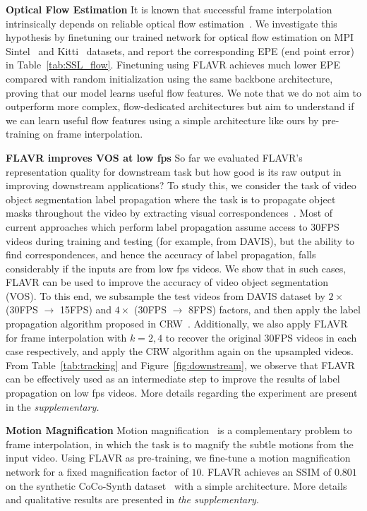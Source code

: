 \documentclass[10pt,twocolumn,letterpaper]{article}
\newcommand{\figref}[1]{Figure~\ref{#1}}
\newcommand{\tabref}[1]{Table~\ref{#1}}
\newcommand{\red}[1]{{#1}}
\newcommand{\Ours}{FLAVR}
\newcommand{\twox}{$2\times$}
\newcommand{\fourx}{$4\times$}
\begin{document}
{\bf Optical Flow Estimation} It is known that successful frame interpolation intrinsically depends on reliable optical flow estimation~\cite{wulff2018temporal}. We investigate this hypothesis by finetuning our trained network for optical flow estimation on MPI Sintel~\cite{Butler_ECCV_2012} and Kitti~\cite{Geiger2012CVPR, Menze2015CVPR} datasets, and report the corresponding EPE (end point error) in \tabref{tab:SSL_flow}. Finetuning using \Ours{} achieves much lower EPE compared with random initialization using the same backbone architecture, proving that our model learns useful flow features. We note that we do not aim to outperform more complex, flow-dedicated architectures\cite{ilg2017flownet, liu2019selflow} but aim to understand if we can learn useful flow features using a simple architecture like ours by pre-training on frame interpolation.

{\bf \Ours{} improves VOS at low fps} \red{ So far we evaluated \Ours{}'s representation quality for downstream task but how good is its raw output in improving downstream applications? To study this, we consider the task of video object segmentation label propagation where the task is to propagate object masks throughout the video by extracting visual correspondences~\cite{jabri2020space, wang2019learning, xu2021rethinking, li2019joint}. Most of current approaches which perform label propagation assume access to 30FPS videos during training and testing (for example, from DAVIS), but the ability to find correspondences, and hence the accuracy of label propagation, falls considerably if the inputs are from low fps videos. We show that in such cases, \Ours{} can be used to improve the accuracy of video object segmentation (VOS). To this end, we subsample the test videos from DAVIS dataset by \twox{} (30FPS $\rightarrow$ 15FPS) and \fourx{} (30FPS $\rightarrow$ 8FPS) factors, and then apply the label propagation algorithm proposed in CRW~\cite{jabri2020space}. Additionally, we also apply \Ours{} for frame interpolation with $k=2,4$ to recover the original 30FPS videos in each case respectively, and apply the CRW algorithm again on the upsampled videos. From \tabref{tab:tracking} and \figref{fig:downstream}, we observe that \Ours{} can be effectively used as an intermediate step to improve the results of label propagation on low fps videos. More details regarding the experiment are present in the \em{supplementary}.}

{\bf Motion Magnification} Motion magnification~\cite{wu2012eulerian, oh2018learning} is a complementary problem to frame interpolation, in which the task is to magnify the subtle motions from the input video. Using \Ours{} as pre-training, we fine-tune a motion magnification network for a fixed magnification factor of $10$. 
\Ours{} achieves an SSIM of $0.801$ on the synthetic CoCo-Synth dataset~\cite{oh2018learning} with a simple architecture.
More details and qualitative results are presented in {\em the supplementary}.
\end{document}
